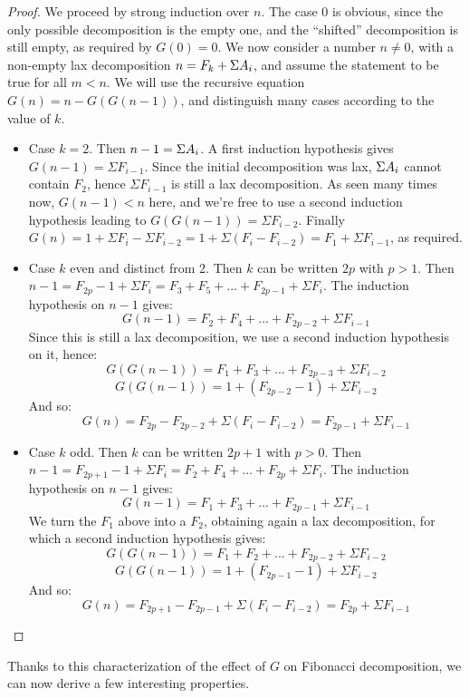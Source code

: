 \documentclass[a4paper,11pt]{article}
\begin{document}
\begin{proof}
We proceed by strong induction over $n$. The case $0$ is obvious,
since the only possible decomposition is the empty one, and the
``shifted'' decomposition is still empty, as required by $G(0)=0$.
We now consider a number $n\neq 0$, with a non-empty lax decomposition
$n = F_k+\Sigma A_i$, and assume the statement to be true for all $m<n$.
We will use the recursive equation $G(n)=n-G(G(n-1))$, and distinguish
many cases according to the value of $k$.
\begin{itemize}
\item Case $k=2$. Then $n-1 = \Sigma A_i$. A first induction
  hypothesis gives $G(n-1) = \Sigma F_{i-1}$. Since the initial
  decomposition was lax, $\Sigma A_i$ cannot contain $F_2$,
  hence $\Sigma F_{i-1}$ is still a lax decomposition. As seen
  many times now, $G(n-1)<n$ here, and we're free to use a second
  induction hypothesis leading to $G(G(n-1)) = \Sigma F_{i-2}$.
  Finally $G(n) = 1+\Sigma F_i - \Sigma F_{i-2} = 1 + \Sigma (F_i-F_{i-2})
   = F_1 + \Sigma F_{i-1}$, as required.

\item Case $k$ even and distinct from 2. Then $k$ can be written $2p$ with $p>1$.
  Then $n-1 = F_{2p}-1 + \Sigma F_i = F_3+F_5+...+F_{2p-1}+\Sigma F_i$.
  The induction hypothesis on $n-1$ gives:
  $$G(n-1) = F_2+F_4+...+F_{2p-2}+\Sigma F_{i-1}$$
  Since this is still a lax decomposition, we use a second
  induction hypothesis on it, hence:
  $$G(G(n-1)) = F_1+F_3+...+F_{2p-3}+\Sigma F_{i-2}$$
  $$G(G(n-1)) = 1 + (F_{2p-2}-1)+\Sigma F_{i-2}$$
  And so:
  $$G(n) = F_{2p}-F_{2p-2} + \Sigma (F_i - F_{i-2}) =
           F_{2p-1} + \Sigma F_{i-1}$$

\item Case $k$ odd. Then $k$ can be written $2p+1$ with $p>0$.
  Then $n-1 = F_{2p+1}-1 + \Sigma F_i = F_2+F_4+...+F_{2p}+\Sigma F_i$.
  The induction hypothesis on $n-1$ gives:
  $$G(n-1) = F_1+F_3+...+F_{2p-1}+\Sigma F_{i-1}$$
  We turn the $F_1$ above into a $F_2$, obtaining again a lax
  decomposition, for which a second induction hypothesis gives:
  $$G(G(n-1)) = F_1+F_2+...+F_{2p-2}+\Sigma F_{i-2}$$
  $$G(G(n-1)) = 1 + (F_{2p-1}-1)+\Sigma F_{i-2}$$
  And so:
  $$G(n) = F_{2p+1}-F_{2p-1} + \Sigma (F_i - F_{i-2}) =
           F_{2p} + \Sigma F_{i-1}$$
\end{itemize}
\end{proof}

Thanks to this characterization of the effect of $G$ on Fibonacci
decomposition, we can now derive a few interesting properties.
\end{document}

